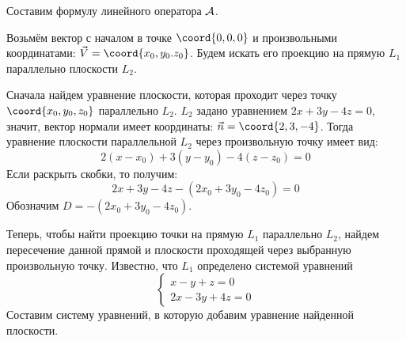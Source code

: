 Составим формулу линейного оператора \(\mathcal{A}\).

Возьмём вектор с началом в точке \(\coord{0, 0, 0}\)
и произвольными координатами: \(\vec{V} = \coord{x_0, y_0. z_0}\).
Будем искать его проекцию на прямую \(L_1\)
параллельно плоскости \(L_2\).

Сначала найдем уравнение плоскости,
которая проходит через точку \(\coord{x_0, y_0, z_0}\) параллельно \(L_2\).
\(L_2\) задано уравнением \(2x+3y-4z=0\), значит,
вектор нормали имеет координаты: \(\vec{n} = \coord{2, 3, -4}\).
Тогда уравнение плоскости параллельной \(L_2\)
через произвольную точку имеет вид:
\[2(x - x_0) + 3(y - y_0) - 4(z - z_0) = 0\]
Если раскрыть скобки, то получим:
\[2 x + 3 y - 4 z - (2 x_0 + 3 y_0 - 4 z_0) = 0\]
Обозначим \(D = - (2x_0+3y_0-4z_0)\).

Теперь, чтобы найти проекцию точки на прямую \(L_1\) параллельно \(L_2\),
найдем пересечение данной прямой и плоскости проходящей через выбранную
произвольную точку.
Известно, что \(L_1\) определено системой уравнений
\[
  \begin{cases}
    x - y + z = 0 \\
    2x - 3y + 4z = 0
  \end{cases}
\]
Составим систему уравнений, в которую добавим уравнение найденной плоскости.
